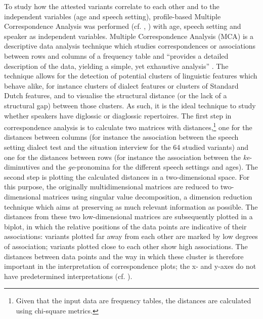 \documentclass[output=paper]{LSP/langsci}
\begin{document}
To study how the attested variants correlate to each other and to the independent variables (age and speech setting), profile-based Multiple Correspondence Analysis was performed (cf. \citealt{de_sutter_lexical_2012}, \citealt{plevoets_tussen_2008}) with age, speech setting and speaker as independent variables. Multiple Correspondence Analysis (MCA) is a descriptive data analysis technique which studies correspondences or associations between rows and columns of a frequency table and “provides a detailed description of the data, yielding a simple, yet exhaustive analysis” \citep[1]{costa_use_2013}. The technique allows for the detection of potential clusters of linguistic features which behave alike, for instance clusters of dialect features or clusters of Standard Dutch features, and to visualise the structural distance (or the lack of a structural gap) between those clusters. As such, it is the ideal technique to study whether speakers have diglossic or diaglossic repertoires. The first step in correspondence analysis is to calculate two matrices with distances,\footnote{ Given that the input data are frequency tables, the distances are calculated using chi-square metrics.} one for the distances between columns (for instance the association between the speech setting dialect test and the situation interview for the 64 studied variants) and one for the distances between rows (for instance the association between the \textit{ke}-diminutives and the \textit{ge}-pronomina for the different speech settings and ages). The second step is plotting the calculated distances in a two-dimensional space. For this purpose, the originally multidimensional matrices are reduced to two-dimensional matrices using singular value decomposition, a dimension reduction technique which aims at preserving as much relevant information as possible. The distances from these two low-dimensional matrices are subsequently plotted in a biplot, in which the relative positions of the data points are indicative of their associations: variants plotted far away from each other are marked by low degrees of association; variants plotted close to each other show high associations. The distances between data points and the way in which these cluster is therefore important in the interpretation of correspondence plots; the x- and y-axes do not have predetermined interpretations (cf. \citealt{geeraerts_schmidt_2010}). 
\end{document}
